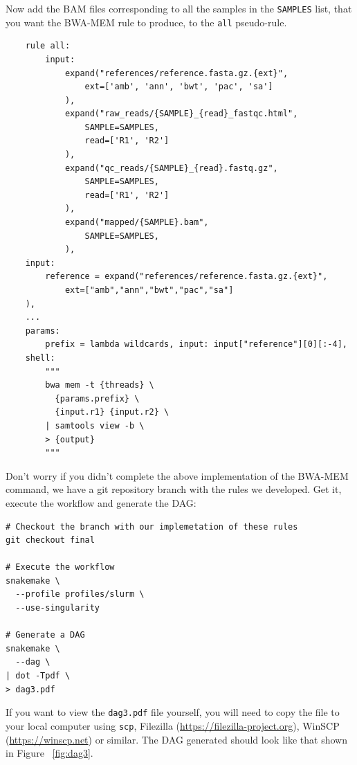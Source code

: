 \begin{questions}

Now add the BAM files corresponding to all the samples in the \texttt{SAMPLES} list, that you want the BWA-MEM rule to produce, to the
\texttt{all} pseudo-rule.

\begin{answer}

\begin{lstlisting}
	rule all:
		input:
			expand("references/reference.fasta.gz.{ext}",
				ext=['amb', 'ann', 'bwt', 'pac', 'sa']
			),
			expand("raw_reads/{SAMPLE}_{read}_fastqc.html",
				SAMPLE=SAMPLES,
				read=['R1', 'R2']
			),
			expand("qc_reads/{SAMPLE}_{read}.fastq.gz",
				SAMPLE=SAMPLES,
				read=['R1', 'R2']
			),
			expand("mapped/{SAMPLE}.bam",
				SAMPLE=SAMPLES,
			),
	input:
		reference = expand("references/reference.fasta.gz.{ext}",
			ext=["amb","ann","bwt","pac","sa"]
	),
	...
	params:
		prefix = lambda wildcards, input: input["reference"][0][:-4],
	shell:
		"""
		bwa mem -t {threads} \
		  {params.prefix} \
		  {input.r1} {input.r2} \
		| samtools view -b \
		> {output}
		"""
\end{lstlisting}

\end{answer}

\end{questions}

Don't worry if you didn't complete the above implementation of the BWA-MEM command, we have a git repository branch with
the rules we developed. Get it, execute the workflow and generate the DAG:

\begin{lstlisting}
# Checkout the branch with our implemetation of these rules
git checkout final

# Execute the workflow
snakemake \
  --profile profiles/slurm \
  --use-singularity

# Generate a DAG
snakemake \
  --dag \
| dot -Tpdf \
> dag3.pdf
\end{lstlisting}

\begin{warning}

If you want to view the \texttt{dag3.pdf} file yourself, you will need to copy the file to your local computer using \texttt{scp},
Filezilla (\url{https://filezilla-project.org}), WinSCP (\url{https://winscp.net}) or similar. The DAG generated should look like
that shown in Figure ~\ref{fig:dag3}.

\end{warning}


